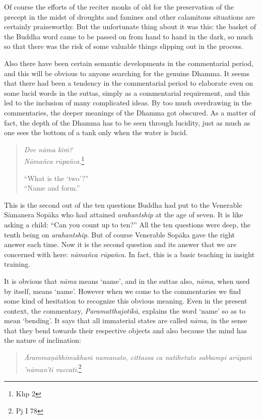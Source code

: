 Of course the efforts of the reciter monks of old for the preservation of the precept in the midst of droughts and famines and other calamitous situations are certainly praiseworthy. But the unfortunate thing about it was this: the basket of the Buddha word came to be passed on from hand to hand in the dark, so much so that there was the risk of some valuable things slipping out in the process.

Also there have been certain semantic developments in the commentarial period, and this will be obvious to anyone searching for the genuine Dhamma. It seems that there had been a tendency in the commentarial period to elaborate even on some lucid words in the suttas, simply as a commentarial requirement, and this led to the inclusion of many complicated ideas. By too much overdrawing in the commentaries, the deeper meanings of the Dhamma got obscured. As a matter of fact, the depth of the Dhamma has to be seen through lucidity, just as much as one sees the bottom of a tank only when the water is lucid.

\begin{quote}
\emph{Dve nāma kiṁ?}\\
\emph{Nāmañca rūpañca}.\footnote{Khp 2}

``What is the `two'?''\\
``Name and form.''
\end{quote}

This is the second out of the ten questions Buddha had put to the Venerable Sāmanera Sopāka who had attained \emph{arahantship} at the age of seven. It is like asking a child: ``Can you count up to ten?'' All the ten questions were deep, the tenth being on \emph{arahantship}. But of course Venerable Sopāka gave the right answer each time. Now it is the second question and its answer that we are concerned with here: \emph{nāmañca rūpañca}. In fact, this is a basic teaching in insight training.

It is obvious that \emph{nāma} means `name', and in the suttas also, \emph{nāma}, when used by itself, means `name'. However when we come to the commentaries we find some kind of hesitation to recognize this obvious meaning. Even in the present context, the commentary, \emph{Paramatthajotikā}, explains the word `name' so as to mean `bending'. It says that all immaterial states are called \emph{nāma}, in the sense that they bend towards their respective objects and also because the mind has the nature of inclination:

\begin{quote}
\emph{Ārammaṇābhimukhaṁ namanato, cittassa ca natihetuto sabbampi arūpaṁ 'nāman'ti vuccati}.\footnote{Pj I 78}
\end{quote}

